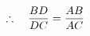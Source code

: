 \documentclass[preview]{standalone}
\begin{document}
\begin{align*}
\special{dvisvgm:raw <g id='unique000'>}\therefore\quad \frac{BD}{DC}=\frac{AB}{AC}\special{dvisvgm:raw </g>}
\end{align*}
\end{document}

